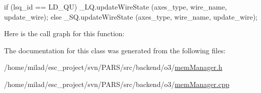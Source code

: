 \begin{DoxyCode}
                                                                                 
                                      {
    if (lsq_id == LD_QU) {
        _LQ.updateWireState (axes_type, wire_name, update_wire);
    } else {
        _SQ.updateWireState (axes_type, wire_name, update_wire);
    }
}
\end{DoxyCode}


Here is the call graph for this function:




The documentation for this class was generated from the following files:\begin{DoxyCompactItemize}
\item 
/home/milad/esc\_\-project/svn/PARS/src/backend/o3/\hyperlink{o3_2memManager_8h}{memManager.h}\item 
/home/milad/esc\_\-project/svn/PARS/src/backend/o3/\hyperlink{o3_2memManager_8cpp}{memManager.cpp}\end{DoxyCompactItemize}
